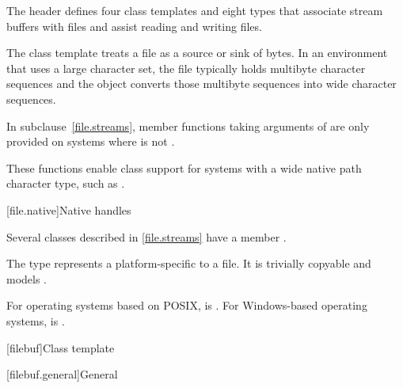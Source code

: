 \pnum
The header 
defines four class templates and eight types
that associate stream buffers with files and assist
reading and writing files.

\pnum
\begin{note}
The class template  treats a file as a source or
sink of bytes. In an environment that uses a large character set, the file
typically holds multibyte character sequences and the 
object converts those multibyte sequences into wide character sequences.
\end{note}

\pnum
In subclause~\ref{file.streams}, member functions taking arguments of 
are only provided on systems where  is not .
\begin{note}
These functions enable class  support for systems with a wide native path character type, such as .
\end{note}

[file.native]{Native handles}

%

\pnum
Several classes described in \ref{file.streams}
have a member .

\pnum
The type  represents a platform-specific
 to a file.
It is trivially copyable and models .

\begin{note}
For operating systems based on POSIX,
 is .
For Windows-based operating systems,
 is .
\end{note}

[filebuf]{Class template }

[filebuf.general]{General}

